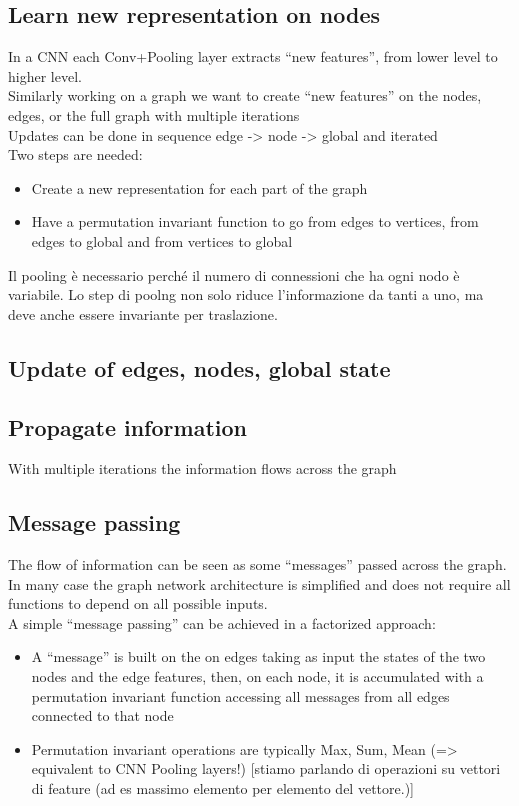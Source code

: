 \subsection{Learn new representation on nodes}

In a CNN each Conv+Pooling layer extracts “new features”, from lower level to higher level.\\

Similarly working on a graph we want to create “new features” on the nodes,
edges, or the full graph with multiple iterations\\

Updates can be done in sequence edge -> node -> global and iterated\\

Two steps are needed:
\begin{itemize}
	\item Create a new representation for each part of the graph 
	\item Have a permutation invariant function to go from edges to vertices, from edges to global and
	from vertices to global
\end{itemize}


Il pooling è necessario perché il numero di connessioni che ha ogni nodo è variabile. Lo step di poolng non solo riduce l'informazione da tanti a uno, ma deve anche essere invariante per traslazione.

\subsection{Update of edges, nodes, global state}

\subsection{Propagate information}

With multiple iterations the information flows across the graph

\subsection{Message passing}
The flow of information can be seen as some “messages” passed across the graph.\\
In many case the graph network architecture is simplified and does not require all
functions to depend on all possible inputs.\\
A simple “message passing” can be achieved in a factorized approach:
\begin{itemize}
	\item A “message” is built on the on edges taking as input the states of the two nodes and the edge features, then,
	on each node, it is accumulated with a permutation invariant function accessing all messages from all edges
	connected to that node
	\item Permutation invariant operations are typically Max, Sum, Mean (=> equivalent to CNN Pooling layers!) [stiamo parlando di operazioni su vettori di feature (ad es massimo elemento per elemento del vettore.)]
\end{itemize}


